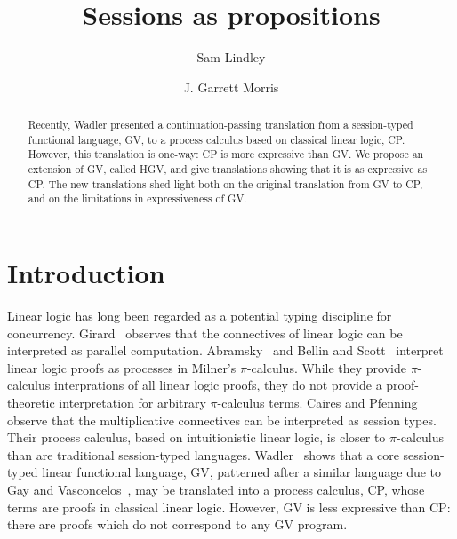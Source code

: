 \documentclass{easychair}
\newcommand{\hgv}{HGV\xspace}
\begin{document}
\title{Sessions as propositions}

\author{
  Sam Lindley
  \and
  J. Garrett Morris
}



\clearpage

\maketitle


\begin{abstract}
  Recently, Wadler presented a continuation-passing translation from a session-typed functional
  language, GV, to a process calculus based on classical linear logic, CP. However, this translation
  is one-way: CP is more expressive than GV. We propose an extension of GV, called \hgv, and give
  translations showing that it is as expressive as CP. The new translations shed light both on the
  original translation from GV to CP, and on the limitations in expressiveness of GV.
\end{abstract}

\section{Introduction}
\label{sect:introduction}

Linear logic has long been regarded as a potential typing discipline for concurrency.
Girard~\cite{Girard87} observes that the connectives of linear logic can be interpreted as parallel
computation. Abramsky~\cite{Abramsky92} and Bellin and Scott~\cite{BellinScott94} interpret linear
logic proofs as processes in Milner's $\pi$-calculus. While they provide $\pi$-calculus
interprations of all linear logic proofs, they do not provide a proof-theoretic interpretation for
arbitrary $\pi$-calculus terms. Caires and Pfenning~\cite{CairesPfenning10} observe that the
multiplicative connectives can be interpreted as session types. Their process calculus, based on
intuitionistic linear logic, is closer to $\pi$-calculus than are traditional session-typed
languages. Wadler~\cite{Wadler12} shows that a core session-typed linear functional language, GV,
patterned after a similar language due to Gay and Vasconcelos~\cite{GayVasconcelos10}, may be
translated into a process calculus, CP, whose terms are proofs in classical linear logic.  However,
GV is less expressive than CP: there are proofs which do not correspond to any GV program.
\end{document}

